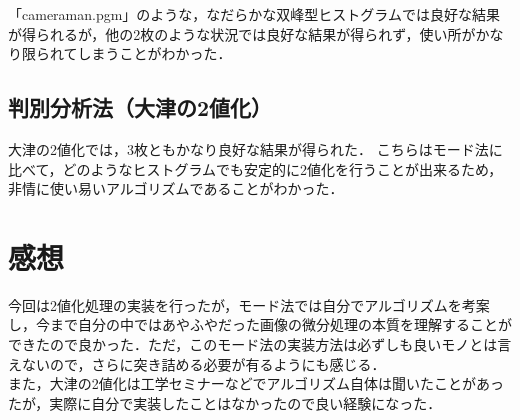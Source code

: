 \documentclass{jsarticle}
\begin{document}
「cameraman.pgm」のような，なだらかな双峰型ヒストグラムでは良好な結果が得られるが，他の2枚のような状況では良好な結果が得られず，使い所がかなり限られてしまうことがわかった．

\subsection{判別分析法（大津の2値化）}
大津の2値化では，3枚ともかなり良好な結果が得られた．
こちらはモード法に比べて，どのようなヒストグラムでも安定的に2値化を行うことが出来るため，非情に使い易いアルゴリズムであることがわかった．

\section{感想}
今回は2値化処理の実装を行ったが，モード法では自分でアルゴリズムを考案し，今まで自分の中ではあやふやだった画像の微分処理の本質を理解することができたので良かった．ただ，このモード法の実装方法は必ずしも良いモノとは言えないので，さらに突き詰める必要が有るようにも感じる．\\
また，大津の2値化は工学セミナーなどでアルゴリズム自体は聞いたことがあったが，実際に自分で実装したことはなかったので良い経験になった．
\end{document}

